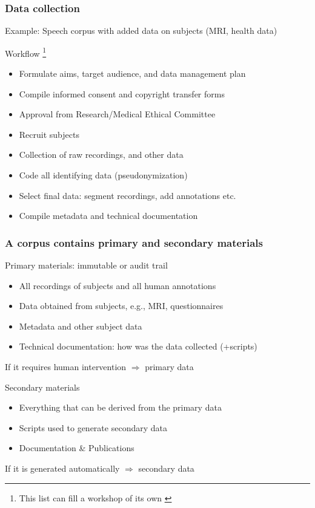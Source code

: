 \documentclass[xcolor=dvipsnames]{beamer}
\begin{document}
\begin{frame}
	\frametitle{Data collection}
	Example: Speech corpus with added data on subjects (MRI, health data)
	
	\begin{block}{Workflow \footnote[frame]{This list can fill a workshop of its own {\scriptsize\cite{BestPractices2012}}} \hspace{7.5cm}{\em use standards!}}
	\begin{itemize}
	\item Formulate aims, target audience, and data management plan
	\item Compile informed consent and copyright transfer forms
	\item Approval from Research/Medical Ethical Committee  
	\item Recruit subjects
	\item Collection of raw recordings, and other data {\scriptsize\cite{draxler2012using}}
	\item Code all identifying data (pseudonymization)
	\item Select final data: segment recordings, add annotations etc. {\scriptsize\cite{drude2012best}}
	\item Compile metadata {\scriptsize\cite{CMDI}} and technical documentation
	\end{itemize}
	\end{block}

\end{frame}
	
\begin{frame}
	\frametitle{A corpus contains primary and secondary materials}
	
	\begin{block}{Primary materials: immutable or audit trail \hspace{2cm}{\em version control}}
	\begin{itemize}
	\item All recordings of subjects and all human annotations
	\item Data obtained from subjects, e.g., MRI, questionnaires
	\item Metadata and other subject data
	\item Technical documentation: how was the data collected (+scripts)
	\end{itemize}
	\end{block}
	If it requires human intervention $\Rightarrow$ primary data
	
	\begin{block}{Secondary materials}
	\begin{itemize}
	\item Everything that can be derived from the primary data
	\item Scripts used to generate secondary data
	\item Documentation \& Publications
	\end{itemize}
	\end{block}
	If it is generated automatically $\Rightarrow$ secondary data
\end{frame}
\end{document}
